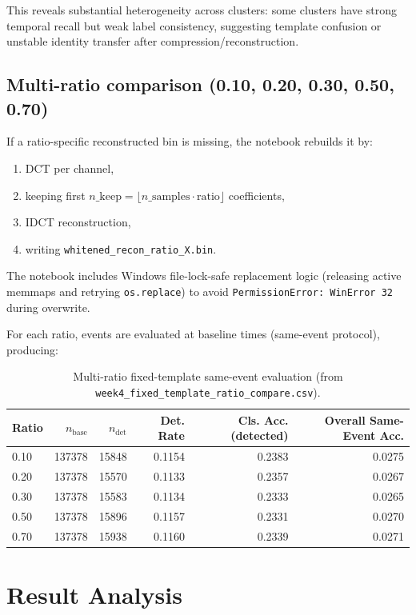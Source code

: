 ﻿\documentclass[11pt]{article}
\begin{document}
This reveals substantial heterogeneity across clusters: some clusters have strong temporal recall but weak label consistency, suggesting template confusion or unstable identity transfer after compression/reconstruction.

\subsection{Multi-ratio comparison (0.10, 0.20, 0.30, 0.50, 0.70)}
If a ratio-specific reconstructed bin is missing, the notebook rebuilds it by:
\begin{enumerate}
  \item DCT per channel,
  \item keeping first $n\_\text{keep}=\lfloor n\_\text{samples}\cdot\text{ratio}\rfloor$ coefficients,
  \item IDCT reconstruction,
  \item writing \texttt{whitened\_recon\_ratio\_X.bin}.
\end{enumerate}

The notebook includes Windows file-lock-safe replacement logic (releasing active memmaps and retrying \texttt{os.replace}) to avoid \texttt{PermissionError: WinError 32} during overwrite.

For each ratio, events are evaluated at baseline times (same-event protocol), producing:
\begin{table}[h!]
\centering
\begin{tabular}{lrrrrr}
\toprule
Ratio & $n_{\text{base}}$ & $n_{\text{det}}$ & Det. Rate & Cls. Acc. (detected) & Overall Same-Event Acc. \\
\midrule
0.10 & 137378 & 15848 & 0.1154 & 0.2383 & 0.0275 \\
0.20 & 137378 & 15570 & 0.1133 & 0.2357 & 0.0267 \\
0.30 & 137378 & 15583 & 0.1134 & 0.2333 & 0.0265 \\
0.50 & 137378 & 15896 & 0.1157 & 0.2331 & 0.0270 \\
0.70 & 137378 & 15938 & 0.1160 & 0.2339 & 0.0271 \\
\bottomrule
\end{tabular}
\caption{Multi-ratio fixed-template same-event evaluation (from \texttt{week4\_fixed\_template\_ratio\_compare.csv}).}
\end{table}

\section{Result Analysis}
\end{document}
